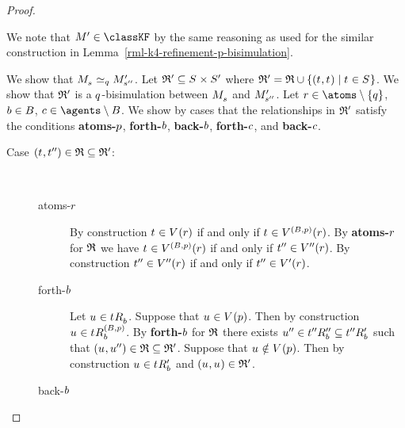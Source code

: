 \begin{proof}
\begin{description}
        We note that $\kModelP \in \classKF$ by the same reasoning as used for the similar construction in Lemma~\ref{rml-k4-refinement-p-bisimulation}.

        We show that $\kPModel{\kStateS} \bisimilar[\atomQ] \kPModelP{\kStateSPP}$.
        Let $\bisimulation' \subseteq \kStates \times \kStatesP$ where $\bisimulation' = \bisimulation \cup \{(\kStateT, \kStateT) \mid \kStateT \in \kStates\}$.
        We show that $\mathfrak{R}'$ is a $q$-bisimulation between $\kPModel{\kStateS}$ and ${M^{\prime}_{{s}^{\prime\prime}}}$.
        Let $\atomR \in \atoms \setminus \{\atomQ\}$, $b \in B$, $\agentC \in \agents \setminus \agentsB$.
        We show by cases that the relationships in $\mathfrak{R}'$ satisfy the conditions {\bf atoms-$p$}, {\bf forth-$b$}, {\bf back-$b$}, {\bf forth-$c$}, and {\bf back-$c$}.
        \begin{description}
            \item[{Case $(\kStateT, \kStateTPP) \in \bisimulation \subseteq \bisimulation'$:}]
                \hfill\\
                \begin{description}
                    \item[atoms-$r$] 
                        By construction $\kStateT \in \kValuation(\atomR)$ if and only if $\kStateT \in \kValuation[(\agentsB, \atomP)](\atomR)$.
                        By {\bf atoms-$r$} for $\mathfrak{R}$ we have $\kStateT \in \kValuation[(\agentsB, \atomP)](\atomR)$ if and only if ${t}^{\prime\prime} \in {V^{\prime\prime}}(r)$.
                        By construction ${t}^{\prime\prime} \in {V^{\prime\prime}}(r)$ if and only if ${t}^{\prime\prime} \in {V^{\prime}}(r)$.
                    \item[forth-$b$]
                        Let $\kStateU \in \kSuccessorsB{\kStateT}$.
                        Suppose that $\kStateU \in \kValuation(\atomP)$.
                        Then by construction $\kStateU \in \kSuccessorsB[(\agentsB, \atomP)]{\kStateT}$.
                        By {\bf forth-$b$} for $\mathfrak{R}$ there exists ${u}^{\prime\prime} \in {{t}^{\prime\prime}} {R^{\prime\prime}_{b}} \subseteq {{t}^{\prime\prime}} {R^{\prime}_{b}}$ such that $(\kStateU, \kStateUPP) \in \bisimulation \subseteq \bisimulation'$.
                        Suppose that $\kStateU \notin \kValuation(\atomP)$.
                        Then by construction $\kStateU \in \kSuccessorsPB{\kStateT}$ and $(\kStateU, \kStateU) \in \bisimulation'$.
                    \item[back-$b$]

\end{description}
\end{description}
\end{description}
\end{proof}
